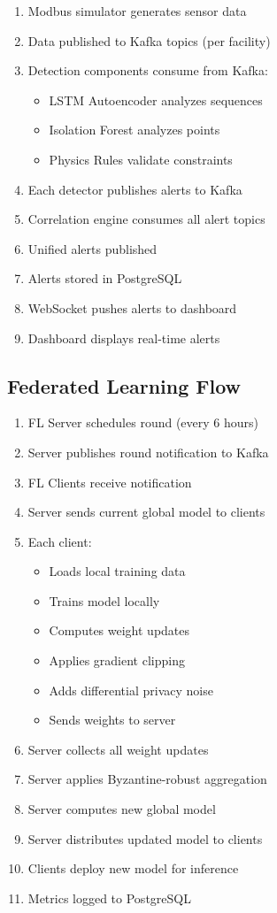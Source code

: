 \documentclass[12pt,a4paper]{article}
\begin{document}
\begin{enumerate}[leftmargin=1cm,itemsep=0pt]
    \item Modbus simulator generates sensor data
    \item Data published to Kafka topics (per facility)
    \item Detection components consume from Kafka:
    \begin{itemize}
        \item LSTM Autoencoder analyzes sequences
        \item Isolation Forest analyzes points
        \item Physics Rules validate constraints
    \end{itemize}
    \item Each detector publishes alerts to Kafka
    \item Correlation engine consumes all alert topics
    \item Unified alerts published
    \item Alerts stored in PostgreSQL
    \item WebSocket pushes alerts to dashboard
    \item Dashboard displays real-time alerts
\end{enumerate}

\subsection{Federated Learning Flow}

\begin{enumerate}[leftmargin=1cm,itemsep=0pt]
    \item FL Server schedules round (every 6 hours)
    \item Server publishes round notification to Kafka
    \item FL Clients receive notification
    \item Server sends current global model to clients
    \item Each client:
    \begin{itemize}
        \item Loads local training data
        \item Trains model locally
        \item Computes weight updates
        \item Applies gradient clipping
        \item Adds differential privacy noise
        \item Sends weights to server
    \end{itemize}
    \item Server collects all weight updates
    \item Server applies Byzantine-robust aggregation
    \item Server computes new global model
    \item Server distributes updated model to clients
    \item Clients deploy new model for inference
    \item Metrics logged to PostgreSQL
\end{enumerate}
\end{document}
